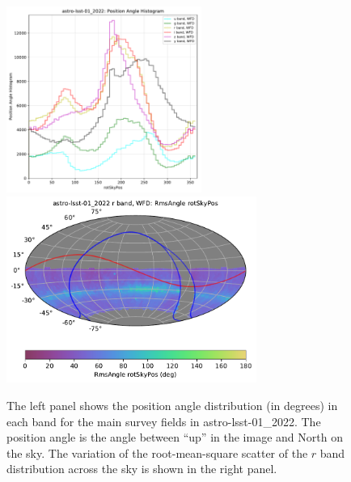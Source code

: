 \documentclass[DM,authoryear,toc]{lsstdoc}
\begin{document}
\begin{figure}[htb]
\centering
\vskip -0.0in
\includegraphics[height=2.4in]{figures/astro-lsst-01_2022-rotpos_hist_per_filter.pdf}
\includegraphics[height=2.4in]{figures/astro-lsst-01_2022_RmsAngle_rotSkyPos_r_band_WFD_OPSI_SkyMap.pdf}
\vskip -0.1in
\caption{The left panel shows the position angle distribution (in degrees) in each band for the
main survey fields in astro-lsst-01\_2022. The position angle is the angle between
``up'' in the image and North on the sky. The variation of the root-mean-square scatter of the
$r$ band distribution across the sky is shown in the right panel.}
\label{fig:baseline_rotator}
\end{figure}
\end{document}
